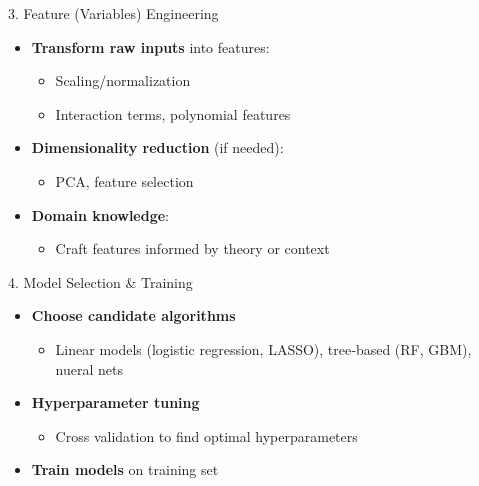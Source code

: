 \documentclass[
  ignorenonframetext,
]{beamer}
\providecommand{\tightlist}{%
  \setlength{\itemsep}{0pt}\setlength{\parskip}{0pt}}
\begin{document}
\begin{frame}{3. Feature (Variables) Engineering}
\label{feature-variables-engineering}
\begin{itemize}
\tightlist
\item
  \textbf{Transform raw inputs} into features:

  \begin{itemize}
  \tightlist
  \item
    Scaling/normalization\\
  \item
    Interaction terms, polynomial features\\
  \end{itemize}
\item
  \textbf{Dimensionality reduction} (if needed):

  \begin{itemize}
  \tightlist
  \item
    PCA, feature selection\\
  \end{itemize}
\item
  \textbf{Domain knowledge}:

  \begin{itemize}
  \tightlist
  \item
    Craft features informed by theory or context
  \end{itemize}
\end{itemize}
\end{frame}

\begin{frame}{4. Model Selection \& Training}
\label{model-selection-training}
\begin{itemize}
\tightlist
\item
  \textbf{Choose candidate algorithms}

  \begin{itemize}
  \tightlist
  \item
    Linear models (logistic regression, LASSO), tree‑based (RF, GBM),
    nueral nets
  \end{itemize}
\item
  \textbf{Hyperparameter tuning}

  \begin{itemize}
  \tightlist
  \item
    Cross validation to find optimal hyperparameters
  \end{itemize}
\item
  \textbf{Train models} on training set
\end{itemize}
\end{frame}
\end{document}
